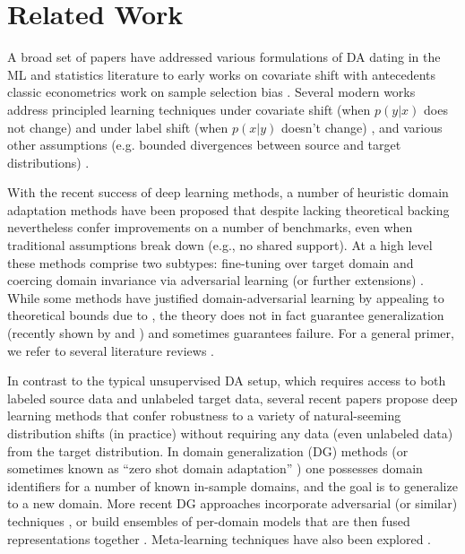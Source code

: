 \documentclass{article}
\begin{document}
 
\section{Related Work}
\label{sec:related}


A broad set of papers have addressed various formulations of DA \citep{bridle1991recnorm,ben2010theory}
dating in the ML and statistics literature 
to early works on covariate shift \citet{shimodaira2000improving}
with antecedents classic econometrics work
on sample selection bias \citep{heckman1977sample,manski1977estimation}. 
Several modern
works address 
principled learning techniques under covariate shift
(when $p(y|x)$ does not change) \citep{gretton2009covariate}
and under label shift (when $p(x|y)$ doesn't change) \citep{storkey2009training, zhang2013domain, lipton2018detecting},
and various other assumptions (e.g. bounded divergences between source and target distributions) \citep{mansour2009domain, hu2016robust}.

With the recent success of deep learning methods, 
a number of heuristic domain adaptation methods 
have been proposed that despite lacking theoretical backing
nevertheless confer improvements on a number of benchmarks,
even when traditional assumptions break down (e.g., no shared support).
At a high level these methods comprise two subtypes:
fine-tuning over target domain
\citep{long2016unsupervised,Hoffman_2017,Motiian_2017,Gebru_2017,NIPS2018_7779} 
and coercing domain invariance via adversarial learning (or further extensions) \citep{ganin2016domain,Bousmalis_2017,Tzeng_2017,pmlr-v80-xie18c,pmlr-v80-hoffman18a,NIPS2018_7436,NIPS2018_8075,NIPS2018_8146,NIPS2018_7913,NIPS2018_7380,schoenauer-sebag2018multidomain}. 
While some methods have justified domain-adversarial learning
by appealing to theoretical bounds due to \cite{ben2010theory},
the theory does not in fact guarantee generalization 
(recently shown by \citet{johansson2019support} and  \citet{wu2019domain})
and sometimes guarantees failure.
For a general primer, we refer to several literature reviews \citep{weiss2016survey,csurka2017domain,Wang_2018}. 



In contrast to the typical unsupervised DA setup, 
which requires access to both labeled source data and unlabeled target data,
several recent papers propose deep learning methods 
that confer robustness to a variety of natural-seeming distribution shifts (in practice)
without requiring any data (even unlabeled data) from the target distribution. 
In domain generalization (DG) methods \citep{muandet2013domain} (or sometimes known as ``zero shot domain adaptation'' \citep{kumagai2018zero, niu2015multi,erfani2016robust,li2017domain})  
one possesses domain identifiers for a number of known in-sample domains,
and the goal is to generalize to a new domain.
More recent DG approaches incorporate adversarial (or similar) techniques \citep{ghifary2015domain,wang2016select,motiian2017unified,li2018domain,carlucci2018agnostic}, 
or build ensembles of per-domain models 
that are then fused representations together \citep{bousmalis2016domain,ding2018deep,mancini2018best}. 
Meta-learning techniques have also been explored \citep{li2017learning,NIPS2018_7378}.
\end{document}
